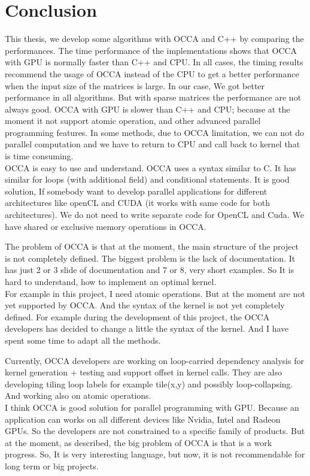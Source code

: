 \setcounter{secnumdepth}{-1}
    \chapter{Conclusion}

This thesis, we develop some algorithms with OCCA and C++ by comparing the performances. The time performance of the implementations shows that OCCA with GPU is normally faster than C++ and CPU.  In all cases, the timing results recommend the usage of OCCA instead of the CPU to get  a better performance when the input size of the matrices is large. In our case, We got better performance in all algorithms. But with sparse matrices the performance are not always good. OCCA with GPU is slower than C++ and CPU; because at the moment it not support atomic operation, and other advanced parallel programming features. In some methods, due to OCCA limitation, we can not do parallel computation and we have to return to CPU and call back to kernel that is time consuming.\\
OCCA is easy to use and understand. OCCA uses a syntax similar to C. It has similar for loops (with additional field) and conditional statements. It is good solution, If somebody want to develop parallel applications for different architectures like openCL and CUDA (it works with same code for both architectures). We do not need to write separate code for OpenCL and Cuda. We have shared or exclusive memory operations in OCCA.

The problem of OCCA is that at the moment, the main structure of the project is not completely defined. The biggest problem is the lack of documentation. It has just 2 or 3 slide of documentation and 7 or 8, very short examples. So It is hard to understand, how to implement an optimal kernel.\\
For example in this project, I need atomic operations. But at the moment are not yet supported by OCCA. And the syntax of the kernel is not yet completely defined. For example during the development of this project, the OCCA developers has decided to change a little the syntax of the kernel. And I have spent some time  to  adapt all the methods.

Currently, OCCA developers are working on loop-carried dependency analysis for kernel generation + testing and support offset in kernel calls. They are also developing tiling loop labels for example tile(x,y) and possibly loop-collapsing. And working also on atomic operations. \\

I think OCCA is good solution for parallel programming with GPU. Because an application can works on all different devices like Nvidia, Intel and Radeon GPUs. So the developers are not constrained to a specific family of products. But at the moment, as described, the big problem of OCCA is that is a work progress. So, It is very interesting language, but now, it is not recommendable for long term or big projects.   